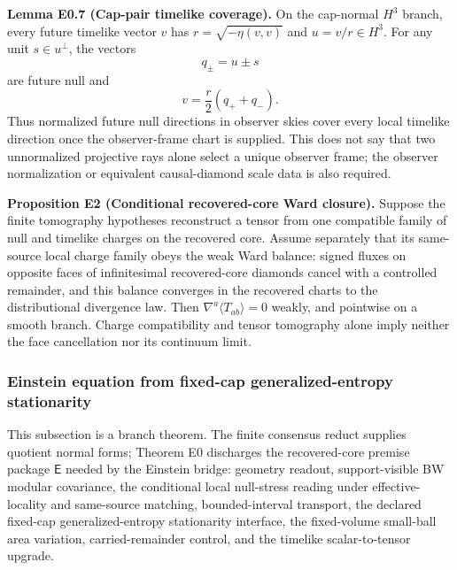 \textbf{Lemma E0.7 (Cap-pair timelike coverage).} On the cap-normal \(H^3\) branch, every future timelike vector \(v\) has \(r=\sqrt{-\eta(v,v)}\) and \(u=v/r\in H^3\). For any unit \(s\in u^\perp\), the vectors
\[
q_\pm=u\pm s
\]
are future null and
\[
v=\frac r2(q_++q_-).
\]
Thus normalized future null directions in observer skies cover every local timelike direction once the observer-frame chart is supplied. This does not say that two unnormalized projective rays alone select a unique observer frame; the observer normalization or equivalent causal-diamond scale data is also required.

\textbf{Proposition E2 (Conditional recovered-core Ward closure).} Suppose the finite tomography hypotheses reconstruct a tensor from one compatible family of null and timelike charges on the recovered core.  Assume separately that its same-source local charge family obeys the weak Ward balance: signed fluxes on opposite faces of infinitesimal recovered-core diamonds cancel with a controlled remainder, and this balance converges in the recovered charts to the distributional divergence law.  Then \(\nabla^a\langle T_{ab}\rangle=0\) weakly, and pointwise on a smooth branch.  Charge compatibility and tensor tomography alone imply neither the face cancellation nor its continuum limit.

\subsubsection{Einstein equation from fixed-cap generalized-entropy stationarity}\label{56-einstein-equation-from-cap-equilibrium}

This subsection is a branch theorem. The finite consensus reduct supplies quotient normal forms; Theorem E0 discharges the recovered-core premise package \(\mathsf{E}\) needed by the Einstein bridge: geometry readout, support-visible BW modular covariance, the conditional local null-stress reading under effective-locality and same-source matching, bounded-interval transport, the declared fixed-cap generalized-entropy stationarity interface, the fixed-volume small-ball area variation, carried-remainder control, and the timelike scalar-to-tensor upgrade.

